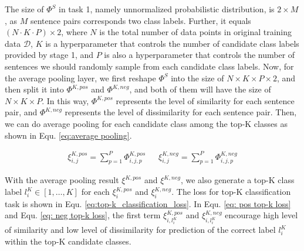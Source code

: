 The size of ${\Phi}^S$ in task 1, namely unnormalized probabilistic distribution, is $2 \times M$, as $M$ sentence pairs corresponds two class labels.
Further, it equals $(N\cdot K\cdot P)\times 2$, where $N$ is the total number of data points in original training data $\mathcal{D}$, $K$ is a hyperparameter that controls the number
of candidate class labels provided by stage 1, and $P$ is also a hyperparameter that controls the number of sentences we should randomly sample from each candidate class labels. 
Now, for the average pooling layer, we first reshape ${\Phi}^S$ into the size of $N\times K\times P\times 2$, and then split it into ${\Phi}^{K,pos}$ and ${\Phi}^{K,neg}$, and both of them will have the size of $N\times K\times P$. 
In this way, ${\Phi}^{K,pos}$ represents the level of similarity for each sentence pair, and ${\Phi}^{K,neg}$ represents the level of dissimilarity for each sentence pair. 
Then, we can do average pooling for each candidate class among the top-K classes as shown in Equ. \ref{eq:average pooling}.

\vspace{-2em}
\begin{align}
  {\xi}_{i,j}^{K,pos} = \sum_{p=1}^{P}{\varPhi}_{i,j,p}^{K,pos} \ \ \ \ \ \ \ 
  {\xi}_{i,j}^{K,neg} = \sum_{p=1}^{P}{\varPhi}_{i,j,p}^{K,neg}
  \label{eq:average pooling}
\end{align}

With the average pooling result ${\xi}^{K,pos}$ and ${\xi}^{K,neg}$, we also
generate a top-K class label $l^{K}_i\in [1,\dots,K]$ for each
${\xi}^{K,pos}_{i}$ and ${\xi}^{K,neg}_{i}$. The loss for top-K classification
task is shown in Equ. \ref{eq:top-k_classification_loss}. In Equ. \ref{eq: pos
top-k loss} and Equ. \ref{eq: neg top-k loss}, the first term
$\xi_{i,l^{K}_{i}}^{K,pos}$ and $\xi_{i,l^{K}_{i}}^{K,neg}$ encourage high
level of similarity and low level of dissimilarity for prediction of the
correct label $l^{K}_i$ within the top-K candidate classes.


